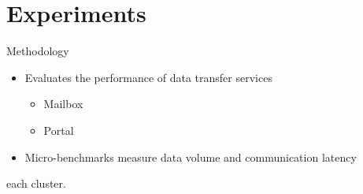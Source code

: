 \section{Experiments}

	\begin{frame}[fragile]{Methodology}
		\begin{itemize}
			\item Evaluates the performance of data transfer services
			\begin{itemize}
				\item Mailbox
				\item Portal
			\end{itemize}
			\item Micro-benchmarks measure data volume and communication latency
		\end{itemize}



	each cluster.
	\end{frame}


